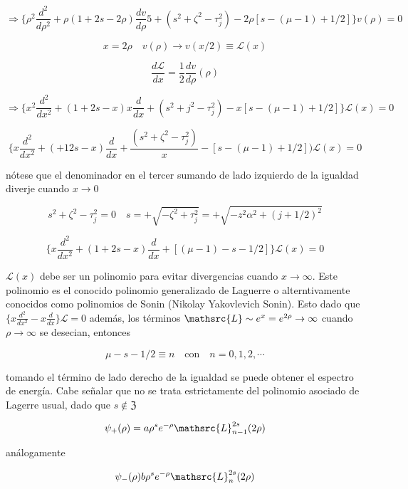 \documentclass{report}
\begin{document}
\[\Rightarrow \lbrace \rho^2 \frac{d^2 }{d \rho ^2 } + \rho (1 + 2s - 2 \rho) \frac{dv}{d \rho} 5+ (s^2 + \zeta ^2 - \tau _{j}^{2}) - 2 \rho [s-(\mu -1)+1/2] \rbrace v (\rho ) = 0\]

\[x = 2 \rho \quad v(\rho ) \rightarrow v (x/2) \equiv \mathscr{L} (x)\]

\[\frac{d \mathscr{L}}{dx} = \frac{1}{2} \frac{dv}{d \rho} (\rho)\]

\[\Rightarrow \lbrace x^2 \frac{d^2 }{dx^2 } + (1+2s-x) x \frac{d}{dx} + (s^2 + j^2 - \tau^{2}_{j}) - x[s-(\mu -1)+1/2]\rbrace \mathscr{L} (x) = 0\]

\[\lbrace x \frac{d^2}{dx^2} + (+12s-x) \frac{d}{dx} + \frac{(s^2 + \zeta ^2 - \tau _{j}^{2})}{x}-[s-(\mu -1)+1/2]) \mathscr{L}(x) = 0\]

nótese que el denominador en el tercer sumando de lado izquierdo de la igualdad diverje cuando $x \rightarrow 0$

\[s^2 + \zeta^2 - \tau _{j}^{2} = 0 \quad s = + \sqrt{- \zeta^2 + \tau_{j}^{2}} = + \sqrt{-z^2 \alpha ^2 + (j + 1/2)^2 }\]

\begin{equation}
\lbrace x \frac{d^2 }{dx^2 } + (1+2s-x)  \frac{d}{dx} + [(\mu - 1)-s -1/2]\rbrace \mathscr{L} (x) = 0
\end{equation}

$\mathscr{L} (x)$ debe ser un polinomio para evitar divergencias cuando $x \rightarrow \infty$. Este polinomio es el conocido polinomio generalizado de Laguerre o alterntivamente conocidos como polinomios de Sonin (Nikolay Yakovlevich Sonin). Esto dado que $\lbrace x \frac{d^2 }{dx^2 } - x \frac{d}{dx}\rbrace \mathscr{L}=0$ además, los términos $\mathsrc{L} \sim e^x = e^{2 \rho } \rightarrow \infty$ cuando $\rho \rightarrow \infty$ se desecian, entonces

\[\mu - s - 1/2 \equiv n \quad \text{con} \quad n = 0,1,2,\cdots \]

tomando el término de lado derecho de la igualdad se puede obtener el espectro de energía. Cabe señalar que no se trata estrictamente del polinomio asociado de Lagerre usual, dado que $s \notin \mathfrak{Z}$

\[\psi _+ (\rho ) = a \rho ^{s} e^{- \rho } \mathsrc{L} _{n-1}^{2s}(2 \rho ) \]

análogamente

\begin{equation}
\psi _- (\rho ) b \rho ^s e^{- \rho } \mathsrc{L} _{n}^{2s}(2 \rho )
\end{equation}
\end{document}
